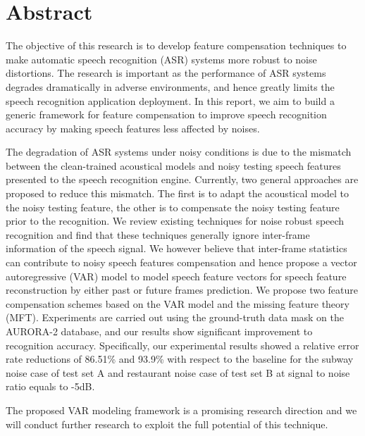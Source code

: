 \chapter* {Abstract}

The objective of this research is to develop feature compensation
techniques to make automatic speech recognition (ASR) systems more
robust to noise distortions.
The research is important as the performance of ASR systems degrades
dramatically in adverse environments, and hence greatly limits the
speech recognition application deployment.
In this report, we aim to build a generic framework for feature
compensation to improve speech recognition accuracy by making speech
features less affected by noises.

The degradation of ASR systems under noisy conditions is due to the
mismatch between the clean-trained acoustical models and noisy
testing speech features presented to the speech recognition engine.
Currently, two general approaches are proposed to reduce this
mismatch. The first is to adapt the acoustical model to the noisy
testing feature, the other is to compensate the noisy testing
feature prior to the recognition. We review existing techniques for
noise robust speech recognition and find that these techniques
generally ignore inter-frame information of the speech signal. We
however believe that inter-frame statistics can contribute to noisy
speech features compensation and hence propose a vector
autoregressive (VAR) model to model speech feature vectors for
speech feature reconstruction by either past or future frames
prediction. We propose two feature compensation schemes based on the
VAR model and the missing feature theory (MFT). Experiments are
carried out using the ground-truth data mask on the AURORA-2
database, and our results show significant improvement to
recognition accuracy. Specifically, our experimental results showed
a relative error rate reductions of 86.51\% and 93.9\% with respect
to the baseline for the subway noise case of test set A and
restaurant noise case of test set B at signal to noise ratio equals
to -5dB.

The proposed VAR modeling framework is a promising research
direction and we will conduct further research to exploit the full
potential of this technique.
